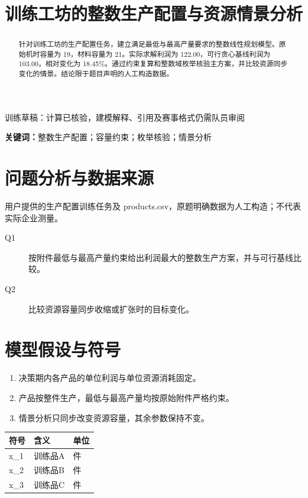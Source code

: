 \documentclass[UTF8,a4paper,11pt,fontset=fandol]{ctexart}
\title{\bfseries 训练工坊的整数生产配置与资源情景分析}
\author{}
\date{}
\begin{document}
\maketitle
\vspace{-2.4em}
\begin{center}\small\color{accent}训练草稿：计算已核验，建模解释、引用及赛事格式仍需队员审阅\end{center}
\begin{abstract}
针对训练工坊的生产配置任务，建立满足最低与最高产量要求的整数线性规划模型。原始机时容量为 19，材料容量为 21。实际求解利润为 122.00，可行贪心基线利润为 103.00，相对变化为 18.45\%。通过约束复算和整数域枚举核验主方案，并比较资源同步变化的情景。结论限于题目声明的人工构造数据。
\end{abstract}
\noindent\textbf{关键词：}整数生产配置；容量约束；枚举核验；情景分析

\section{问题分析与数据来源}
用户提供的生产配置训练任务及 products.csv，原题明确数据为人工构造；不代表实际企业测量。
\begin{description}

\item[Q1] 按附件最低与最高产量约束给出利润最大的整数生产方案，并与可行基线比较。

\item[Q2] 比较资源容量同步收缩或扩张时的目标变化。

\end{description}

\section{模型假设与符号}
\begin{enumerate}

\item 决策期内各产品的单位利润与单位资源消耗固定。

\item 产品按整件生产，最低与最高产量均按原始附件严格约束。

\item 情景分析只同步改变资源容量，其余参数保持不变。

\end{enumerate}
\begin{longtable}{p{}p{}p{}}
\toprule 符号 & 含义 & 单位 \\ \midrule

x\_1 & 训练品A & 件 \\

x\_2 & 训练品B & 件 \\

x\_3 & 训练品C & 件 \\

\bottomrule
\end{longtable}
\end{document}

